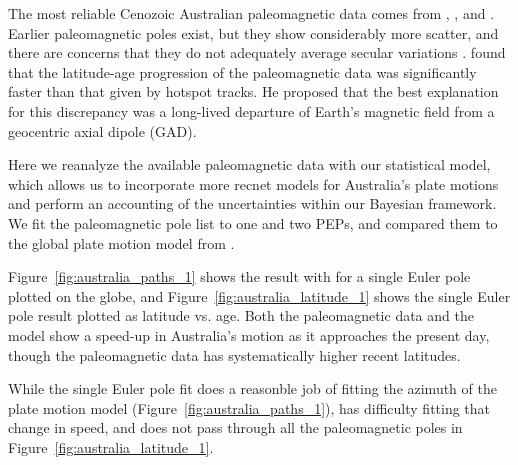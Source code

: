\documentclass[preprint,12pt,authoryear]{elsarticle}
\begin{document}
The most reliable Cenozoic Australian paleomagnetic data comes from \citet{idnurm1985lateI},
\citet{idnurm1985lateII}, and \citet{idnurm1994new}.
Earlier paleomagnetic poles exist, but they show considerably more scatter,
and there are concerns that they do not adequately average secular variations
\citep{idnurm1985lateI, klootwijk2009sedimentary}.
\citet{idnurm1985lateII} found that the latitude-age progression of the paleomagnetic
data was significantly faster than that given by hotspot tracks.
He proposed that the best explanation for this discrepancy was a long-lived
departure of Earth's magnetic field from a geocentric axial dipole (GAD).

Here we reanalyze the available paleomagnetic data with our statistical model,
which allows us to incorporate more recnet models for Australia's plate motions
and perform an accounting of the uncertainties within our Bayesian framework.
We fit the paleomagnetic pole list to one and two PEPs, and compared them
to the global plate motion model from \citet{seton2012global}.

Figure~\ref{fig:australia_paths_1} shows the result with for a single Euler pole
plotted on the globe, and Figure~\ref{fig:australia_latitude_1} shows the single Euler pole result
plotted as latitude vs. age.
Both the paleomagnetic data and the \citet{seton2012global} model show a speed-up in
Australia's motion as it approaches the present day, though the paleomagnetic data
has systematically higher recent latitudes. 

While the single Euler pole fit does a reasonble job of fitting the azimuth of the plate motion model 
(Figure~\ref{fig:australia_paths_1}), has difficulty fitting that change in speed, 
and does not pass through all the paleomagnetic poles in Figure~\ref{fig:australia_latitude_1}.
\end{document}
